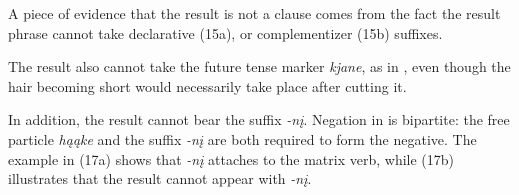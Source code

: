 \documentclass[output=paper]{LSP/langsci}
\begin{document}
A piece of evidence that the result  is not a clause comes from the fact the result phrase cannot take declarative (15a), or complementizer (15b) suffixes.

\begin{exe}
\ex\label{ex:rosen:15}
\begin{xlist}



\end{xlist}
\end{exe}

The result also cannot take the future tense marker \textit{kjane}, as in , even though the hair becoming short would necessarily take place after cutting it.

\begin{exe}


\end{exe}

In addition, the result cannot bear the  suffix \textit{-nį}. Negation in  is bipartite: the free particle \textit{hąąke} and the suffix \textit{-nį} are both required to form the negative. The example in (17a) shows that \textit{-nį} attaches to the matrix verb, while (17b) illustrates that the result cannot appear with \textit{-nį}.
\end{document}
